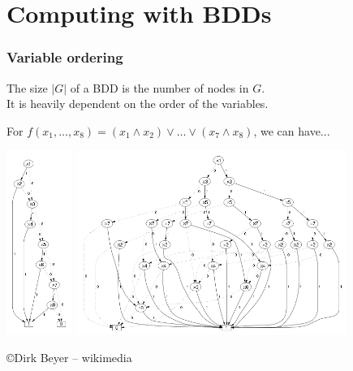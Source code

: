 \documentclass[10pt,a4paper,pdf]{beamer}
\begin{document}
\begin{frame}[t]
{\begin{minipage}[t]{.54\linewidth}
\begin{center}
{\begin{tikzpicture}
\end{tikzpicture}}
\end{center}
\end{minipage}}
\end{frame}

\section{Computing with BDDs}

\begin{frame}
\frametitle{Variable ordering}

The size $|G|$ of a BDD is the number of nodes in $G$.\\
It is heavily dependent on the order of the variables.

For $f(x_1, \ldots, x_8) = (x_1 \land x_2) \lor \ldots \lor (x_7 \land x_8)$, we can have...

\includegraphics[height=6cm]{images/good.png}
\includegraphics[height=6cm]{images/bad.png}

{\tiny\copyright Dirk Beyer -- wikimedia}

\end{frame}
\end{document}

